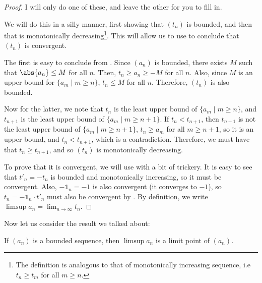 \begin{proof}
I will only do one of these, and leave the other for you to fill in.

We will do this in a silly manner, first showing that $(t_n)$ is bounded,
and then that is monotonically decreasing\footnote[0cm]{The definition is analogous to that of
monotonically increasing sequence, i.e $t_n \ge t_m$ for all $m \ge n$.}. This will allow
us to use  to conclude that $(t_n)$ is convergent.

The first is easy to conclude from . Since $(a_n)$ is bounded,
there exists $M$ such that $\abs{a_n} \le M$ for all $n$. Then,
$t_n \ge a_n \ge -M$ for all $n$. Also, since $M$ is an upper bound for $\{a_m \mid m \ge n\}$,
$t_n \le M$ for all $n$. Therefore, $(t_n)$ is also bounded.


Now for the latter, we note that $t_n$ is the least upper bound of $\{a_m \mid m \ge n\}$,
and $t_{n+1}$ is the least upper bound of $\{a_m \mid m \ge n+1\}$. If $t_n < t_{n+1}$,
then $t_{n+1}$ is not the least upper bound of $\{a_m \mid m \ge n + 1\}$, $t_n \ge a_m$ for all $m \ge n + 1$,
so it is an upper bound, and $t_n < t_{n+1}$, which is a contradiction. Therefore, we must have that
$t_n \ge t_{n+1}$, and so $(t_n)$ is monotonically decreasing.

To prove that it is convergent, we will use  with a bit of trickery.
It is easy to see that $t'_n = -t_n$ is bounded and monotonically increasing, so it
must be convergent. Also, $-\mathbb{1}_n = -1$ is also convergent (it converges to $-1$), so
$t_n = -\mathbb{1}_n \cdot t'_n$ must also be convergent by .
By definition, we write $\limsup a_n = \lim_{n \to \infty} t_n$.
\end{proof}

Now let us consider the result we talked about:

\begin{theorem}
    If $(a_n)$ is a bounded sequence, then $\limsup a_n$ is a limit point of $(a_n)$.
\end{theorem}

